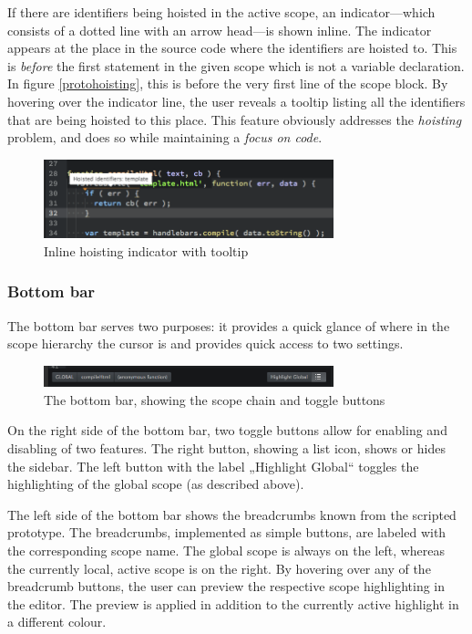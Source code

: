 If there are identifiers being hoisted in the active scope, an
indicator—which consists of a dotted line with an arrow head—is shown
inline. The indicator appears at the place in the source code where the
identifiers are hoisted to. This is \emph{before} the first statement in
the given scope which is not a variable declaration. In figure
\ref{protohoisting}, this is before the very first line of the scope
block. By hovering over the indicator line, the user reveals a tooltip
listing all the identifiers that are being hoisted to this place. This
feature obviously addresses the \emph{hoisting} problem, and does so
while maintaining a \emph{focus on code}.

\begin{figure}[htbp]
\centering
\includegraphics[keepaspectratio,width=0.75\textwidth]{img/hoisting.png}
\caption{Inline hoisting indicator with tooltip}
\label{fig:protohoisting}
\end{figure}

\subsubsection{Bottom bar}\label{bottom-bar}

The bottom bar serves two purposes: it provides a quick glance of where
in the scope hierarchy the cursor is and provides quick access to two
settings.

\begin{figure}[htbp]
\centering
\includegraphics[keepaspectratio,width=0.75\textwidth]{img/bottombar.png}
\caption{The bottom bar, showing the scope chain and toggle buttons}
\label{fig:bottombar}
\end{figure}

On the right side of the bottom bar, two toggle buttons allow for
enabling and disabling of two features. The right button, showing a list
icon, shows or hides the sidebar. The left button with the label
„Highlight Global“ toggles the highlighting of the global scope (as
described above).

The left side of the bottom bar shows the breadcrumbs known from the
scripted prototype. The breadcrumbs, implemented as simple buttons, are
labeled with the corresponding scope name. The global scope is always on
the left, whereas the currently local, active scope is on the right. By
hovering over any of the breadcrumb buttons, the user can preview the
respective scope highlighting in the editor. The preview is applied in
addition to the currently active highlight in a different colour.

